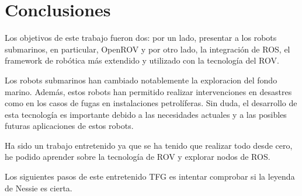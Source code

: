 \chapter{Conclusiones}
\label{cap:conclusiones}

Los objetivos de este trabajo fueron dos: por un lado, presentar a los robots submarinos, en particular, OpenROV y por otro lado, la integración de ROS, el framework de robótica más extendido y utilizado con la tecnología del ROV.

Los robots submarinos han cambiado notablemente la exploracion del fondo marino. Además, estos robots han permitido realizar intervenciones en desastres como en los casos de fugas en instalaciones petrolíferas. Sin duda, el desarrollo de esta tecnología es importante debido a las necesidades actuales y a las posibles futuras aplicaciones de estos robots.

Ha sido un trabajo entretenido ya que se ha tenido que realizar todo desde cero, he podido aprender sobre la tecnología de ROV y explorar nodos de ROS.

Los siguientes pasos de este entretenido TFG es intentar comprobar si la leyenda de Nessie es cierta.
